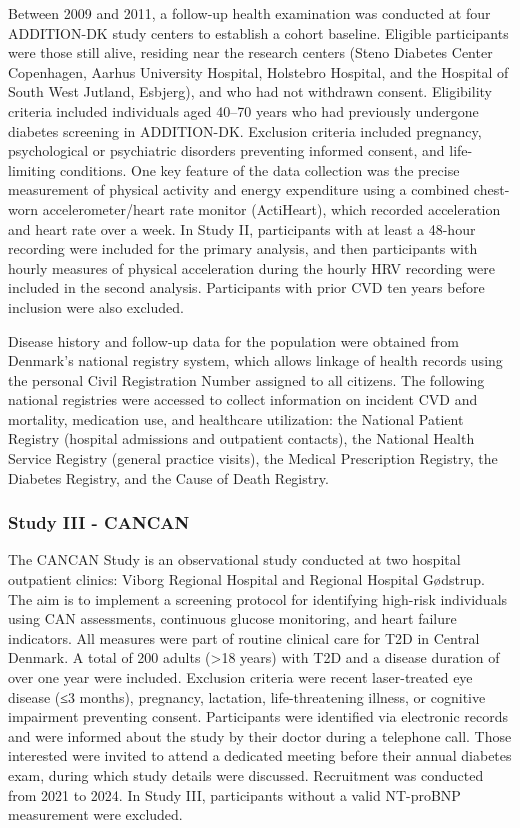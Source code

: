 \documentclass[
  a4paper,
  headsepline=true,
  open=left]{scrbook}
\begin{document}
Between 2009 and 2011, a follow-up health examination was conducted at
four ADDITION-DK study centers to establish a cohort baseline. Eligible
participants were those still alive, residing near the research centers
(Steno Diabetes Center Copenhagen, Aarhus University Hospital, Holstebro
Hospital, and the Hospital of South West Jutland, Esbjerg), and who had
not withdrawn consent. Eligibility criteria included individuals aged
40--70 years who had previously undergone diabetes screening in
ADDITION-DK. Exclusion criteria included pregnancy, psychological or
psychiatric disorders preventing informed consent, and life-limiting
conditions. One key feature of the data collection was the precise
measurement of physical activity and energy expenditure using a combined
chest-worn accelerometer/heart rate monitor (ActiHeart), which recorded
acceleration and heart rate over a week. In Study II, participants with
at least a 48-hour recording were included for the primary analysis, and
then participants with hourly measures of physical acceleration during
the hourly HRV recording were included in the second analysis.
Participants with prior CVD ten years before inclusion were also
excluded.

Disease history and follow-up data for the population were obtained from
Denmark's national registry system, which allows linkage of health
records using the personal Civil Registration Number assigned to all
citizens. The following national registries were accessed to collect
information on incident CVD and mortality, medication use, and
healthcare utilization: the National Patient Registry (hospital
admissions and outpatient contacts), the National Health Service
Registry (general practice visits), the Medical Prescription Registry,
the Diabetes Registry, and the Cause of Death Registry.

\hypertarget{study-iii---cancan}{%
\subsubsection{Study III - CANCAN}\label{study-iii---cancan}}

The CANCAN Study is an observational study conducted at two hospital
outpatient clinics: Viborg Regional Hospital and Regional Hospital
Gødstrup. The aim is to implement a screening protocol for identifying
high-risk individuals using CAN assessments, continuous glucose
monitoring, and heart failure indicators. All measures were part of
routine clinical care for T2D in Central Denmark. A total of 200 adults
(\textgreater18 years) with T2D and a disease duration of over one year
were included. Exclusion criteria were recent laser-treated eye disease
(≤3 months), pregnancy, lactation, life-threatening illness, or
cognitive impairment preventing consent. Participants were identified
via electronic records and were informed about the study by their doctor
during a telephone call. Those interested were invited to attend a
dedicated meeting before their annual diabetes exam, during which study
details were discussed. Recruitment was conducted from 2021 to 2024. In
Study III, participants without a valid NT-proBNP measurement were
excluded.
\end{document}
